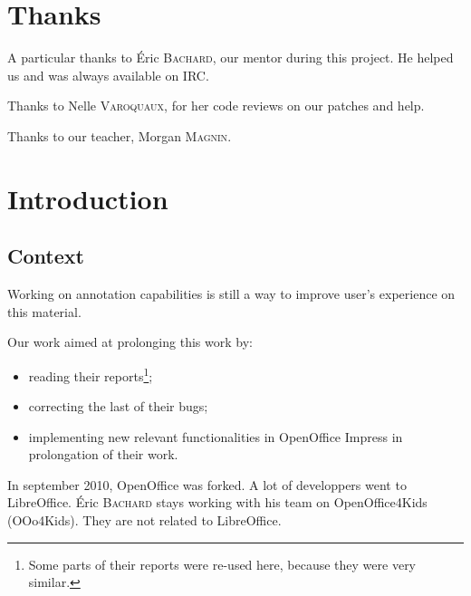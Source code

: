 \documentclass[a4paper,11pt]{article}
\begin{document}
\newpage
\tableofcontents

\newpage

\setcounter{page}{1}
\fancyfoot[C]{\thepage}
\section*{Thanks}
A particular thanks to Éric \textsc{Bachard}, our mentor during this project. He helped us and was always available on IRC.

Thanks to Nelle \textsc{Varoquaux}, for her code reviews on our patches and help.

Thanks to our teacher, Morgan \textsc{Magnin}.

\newpage

\fancyfoot[C]{\thepage}
\section*{Introduction}

\subsection*{Context}

Working on annotation capabilities is still
a way to improve user's experience on this material.

Our work aimed at prolonging this work by:

\begin{itemize}

\item reading their reports\footnote{Some parts of their reports were re-used
here, because they were very similar.};

\item correcting the last of their bugs;

\item implementing new relevant functionalities in OpenOffice Impress in
prolongation of their work.

\end{itemize}

In september 2010, OpenOffice was forked. A lot of developpers went to
LibreOffice. Éric \textsc{Bachard} stays working with his team on
OpenOffice4Kids (OOo4Kids). They are not related to LibreOffice.
\end{document}
